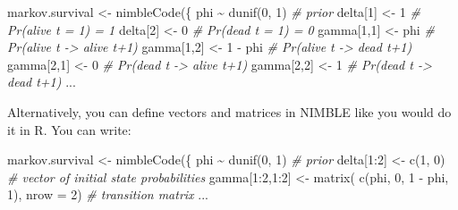 \documentclass[
  12pt,
]{krantz}
\newenvironment{Shaded}{\begin{snugshade}}{\end{snugshade}}
\newcommand{\AttributeTok}[1]{\textcolor[rgb]{0.77,0.63,0.00}{#1}}
\newcommand{\CommentTok}[1]{\textcolor[rgb]{0.56,0.35,0.01}{\textit{#1}}}
\newcommand{\DecValTok}[1]{\textcolor[rgb]{0.00,0.00,0.81}{#1}}
\newcommand{\FunctionTok}[1]{\textcolor[rgb]{0.00,0.00,0.00}{#1}}
\newcommand{\NormalTok}[1]{#1}
\newcommand{\OtherTok}[1]{\textcolor[rgb]{0.56,0.35,0.01}{#1}}
\newcommand{\SpecialCharTok}[1]{\textcolor[rgb]{0.00,0.00,0.00}{#1}}
\begin{document}
\begin{Shaded}
\begin{Highlighting}[]
\NormalTok{markov.survival }\OtherTok{\textless{}{-}} \FunctionTok{nimbleCode}\NormalTok{(\{}
\NormalTok{  phi }\SpecialCharTok{\textasciitilde{}} \FunctionTok{dunif}\NormalTok{(}\DecValTok{0}\NormalTok{, }\DecValTok{1}\NormalTok{) }\CommentTok{\# prior}
\NormalTok{  delta[}\DecValTok{1}\NormalTok{] }\OtherTok{\textless{}{-}} \DecValTok{1}          \CommentTok{\# Pr(alive t = 1) = 1}
\NormalTok{  delta[}\DecValTok{2}\NormalTok{] }\OtherTok{\textless{}{-}} \DecValTok{0}          \CommentTok{\# Pr(dead t = 1) = 0}
\NormalTok{  gamma[}\DecValTok{1}\NormalTok{,}\DecValTok{1}\NormalTok{] }\OtherTok{\textless{}{-}}\NormalTok{ phi      }\CommentTok{\# Pr(alive t {-}\textgreater{} alive t+1)}
\NormalTok{  gamma[}\DecValTok{1}\NormalTok{,}\DecValTok{2}\NormalTok{] }\OtherTok{\textless{}{-}} \DecValTok{1} \SpecialCharTok{{-}}\NormalTok{ phi  }\CommentTok{\# Pr(alive t {-}\textgreater{} dead t+1)}
\NormalTok{  gamma[}\DecValTok{2}\NormalTok{,}\DecValTok{1}\NormalTok{] }\OtherTok{\textless{}{-}} \DecValTok{0}        \CommentTok{\# Pr(dead t {-}\textgreater{} alive t+1)}
\NormalTok{  gamma[}\DecValTok{2}\NormalTok{,}\DecValTok{2}\NormalTok{] }\OtherTok{\textless{}{-}} \DecValTok{1}        \CommentTok{\# Pr(dead t {-}\textgreater{} dead t+1)}
\NormalTok{...}
\end{Highlighting}
\end{Shaded}

Alternatively, you can define vectors and matrices in NIMBLE like you would do it in R. You can write:

\begin{Shaded}
\begin{Highlighting}[]
\NormalTok{markov.survival }\OtherTok{\textless{}{-}} \FunctionTok{nimbleCode}\NormalTok{(\{}
\NormalTok{  phi }\SpecialCharTok{\textasciitilde{}} \FunctionTok{dunif}\NormalTok{(}\DecValTok{0}\NormalTok{, }\DecValTok{1}\NormalTok{) }\CommentTok{\# prior}
\NormalTok{  delta[}\DecValTok{1}\SpecialCharTok{:}\DecValTok{2}\NormalTok{] }\OtherTok{\textless{}{-}} \FunctionTok{c}\NormalTok{(}\DecValTok{1}\NormalTok{, }\DecValTok{0}\NormalTok{) }\CommentTok{\# vector of initial state probabilities}
\NormalTok{  gamma[}\DecValTok{1}\SpecialCharTok{:}\DecValTok{2}\NormalTok{,}\DecValTok{1}\SpecialCharTok{:}\DecValTok{2}\NormalTok{] }\OtherTok{\textless{}{-}} \FunctionTok{matrix}\NormalTok{( }\FunctionTok{c}\NormalTok{(phi, }\DecValTok{0}\NormalTok{, }\DecValTok{1} \SpecialCharTok{{-}}\NormalTok{ phi, }\DecValTok{1}\NormalTok{), }\AttributeTok{nrow =} \DecValTok{2}\NormalTok{) }\CommentTok{\# transition matrix}
\NormalTok{...}
\end{Highlighting}
\end{Shaded}
\end{document}
